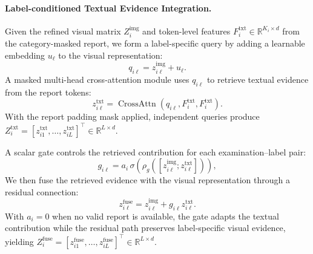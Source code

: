 \paragraph{Label-conditioned Textual Evidence Integration.}
Given the refined visual matrix $Z_i^{\mathrm{img}}$ and token-level features
$F_i^{\mathrm{txt}}\in\mathbb{R}^{K_i\times d}$ from the category-masked report,
we form a label-specific query by adding a learnable embedding $u_\ell$ to the
visual representation:
\begin{equation}
q_{i\ell}=z_{i\ell}^{\mathrm{img}}+u_\ell.
\label{eq:lccf_query_new}
\end{equation}
A masked multi-head cross-attention module uses $q_{i\ell}$ to retrieve
textual evidence from the report tokens:
\begin{equation}
z_{i\ell}^{\mathrm{txt}}
=\operatorname{CrossAttn}\!\left(q_{i\ell},F_i^{\mathrm{txt}},F_i^{\mathrm{txt}}\right).
\label{eq:lccf_text_retrieval_new}
\end{equation}
With the report padding mask applied, independent queries produce
$Z_i^{\mathrm{txt}}=[z_{i1}^{\mathrm{txt}},\ldots,
z_{iL}^{\mathrm{txt}}]^{\top}\in\mathbb{R}^{L\times d}$.

A scalar gate controls the retrieved contribution for each examination--label
pair:
\begin{equation}
g_{i\ell}=a_i\,\sigma\!\left(\rho_g([z_{i\ell}^{\mathrm{img}};z_{i\ell}^{\mathrm{txt}}])\right),
\label{eq:lccf_gate_fusion_new}
\end{equation}
We then fuse the retrieved evidence with the visual representation through a
residual connection:
\begin{equation}
z_{i\ell}^{\mathrm{fuse}}
=z_{i\ell}^{\mathrm{img}}+g_{i\ell}z_{i\ell}^{\mathrm{txt}}.
\label{eq:lccf_fusion_new}
\end{equation}
With $a_i=0$ when no valid report is available, the gate adapts the textual
contribution while the residual path preserves label-specific visual evidence,
yielding
$Z_i^{\mathrm{fuse}}=[z_{i1}^{\mathrm{fuse}},\ldots,z_{iL}^{\mathrm{fuse}}]^{\top}
\in\mathbb{R}^{L\times d}$.

